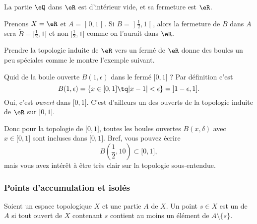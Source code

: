 \begin{lemma}       \label{LEMooIGQCooOrroHT}
	La partie \( \eQ\) dans \( \eR\) est d'intérieur vide, et sa fermeture est \( \eR\).
\end{lemma}

\begin{example} \label{ExloeyoR}
	Prenons \( X=\eR\) et \( A=\mathopen] 0 , 1 \mathclose[\). Si \( B=\mathopen] \frac{ 1 }{2} , 1 \mathclose[ \), alors la fermeture de \( B\) dans \( A\) sera \( \tilde B=\mathopen[ \frac{ 1 }{2} , 1 [\) et non \( \mathopen[ \frac{ 1 }{2} , 1 \mathclose]\) comme on l'aurait dans \( \eR\).
\end{example}

Prendre la topologie induite de \( \eR\) vers un fermé de \( \eR\) donne des boules un peu spéciales comme le montre l'exemple suivant.

\begin{example}  \label{ExKYZwYxn}
	Quid de la boule ouverte \( B(1,\epsilon)\) dans le fermé \( \mathopen[ 0 , 1 \mathclose]\) ? Par définition c'est
	\begin{equation}
		B(1,\epsilon)=\{ x\in\mathopen[ 0 , 1 \mathclose]\tq | x-1 |<\epsilon \}=\mathopen] 1-\epsilon , 1 \mathclose].
	\end{equation}
	Oui, c'est \emph{ouvert} dans \( \mathopen[ 0 , 1 \mathclose]\). C'est d'ailleurs un des ouverts de la topologie induite de \( \eR\) sur \( \mathopen[ 0 , 1 \mathclose]\).

	Donc pour la topologie de \( \mathopen[ 0 , 1 \mathclose]\), toutes les boules ouvertes \( B(x,\delta)\) avec \( x\in\mathopen[ 0 , 1 \mathclose]\) sont incluses dans \( \mathopen[ 0 , 1 \mathclose]\). Bref, vous pouvez écrire
	\begin{equation}
		B(\frac{ 1 }{2}, 10)\subset \mathopen[ 0 , 1 \mathclose],
	\end{equation}
	mais vous avez intérêt à être très clair sur la topologie sous-entendue.
\end{example}


\subsubsection{Points d'accumulation et isolés}

\begin{definition}      \label{DEFooGHUUooZKTJRi}
	Soient un espace topologique \( X\) et une partie \( A\) de \( X\). Un point \( s\in X \) est un  de \( A\) si tout ouvert de \( X\) contenant \( s\) contient au moins un élément de \( A\setminus\{ s \}\).
\end{definition}

